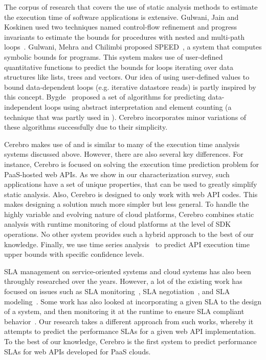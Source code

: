 The corpus of research that covers the use of static analysis methods 
to estimate the execution time of software applications is 
extensive. Gulwani, Jain and Koskinen used two techniques named control-flow
 refinement and progress invariants to estimate the bounds for procedures with nested and multi-path loops~\cite{Gulwani:2009:CRP:1542476.1542518}.
 Gulwani, Mehra and Chilimbi proposed SPEED~\cite{Gulwani:2009:SPE:1480881.1480898}, a system that computes symbolic bounds for programs. This
 system makes use of user-defined quantitative functions to predict the bounds for loops iterating over
data structures like lists, trees and vectors. Our idea of using user-defined values to bound
 data-dependent loops (e.g. iterative datastore reads) is partly inspired by this concept.
 Bygde~\cite{bygde2010static} proposed a set of algorithms for predicting data-independent loops using abstract interpretation
 and element counting (a technique that was partly used in \cite{ermedahl2007loop}). 
Cerebro incorporates minor variations of these algorithms successfully due to their
simplicity.  
 
Cerebro makes use of and is similar to many of the execution time analysis 
systems discussed above.  However, there are also several key differences. 
For instance, Cerebro is focused on solving the
execution time prediction problem for PaaS-hosted web APIs. 
As we show in our characterization survey, such applications 
have a set of unique properties, that can be used to greatly simplify static analysis.
Also, Cerebro is designed to only work with web API codes. This makes designing 
a solution much more simpler but less general.
To handle the highly variable and evolving nature of
cloud platforms, Cerebro combines static analysis with runtime
monitoring of cloud platforms at the level of SDK operations. No other 
system provides such a hybrid approach to the best of our knowledge. 
Finally,
we use time series analysis~\cite{Nurmi:2007:QQB:1791551.1791556} 
to predict API execution time upper bounds with specific confidence
levels.

SLA management on service-oriented systems and cloud systems has also been 
throughly researched
over the years. However, a lot of the existing work has focused on issues 
such as SLA monitoring~\cite{Michlmayr:2009:CQM:1657755.1657756,Tripathy:2011:MMS:1980822.1980832,Raimondi:2008:EOM:1453101.1453125,Bertolino:2007:SUS:1294904.1294914}, SLA negotiation~\cite{Mahbub:2011:PSN:2061042.2062022,Yaqub:2014:ONS:2680847.2681496,6546098}, and SLA modeling~\cite{Chau:2008:ASM:1463788.1463802,Stamou:2013:SGM:2516588.2516592,Skene:2004:PSL:998675.999422}. 
Some work has also looked at incorporating a given SLA to the design of a system, and
then monitoring it at the runtime to ensure SLA compliant behavior~\cite{He:2013:TSC:2532443.2532449}. 
Our research takes a
different approach from such works, whereby it attempts to predict the performance SLAs for a
given web API implementation. To the best of our knowledge, Cerebro is the first system to predict performance SLAs for web APIs developed for PaaS clouds.

